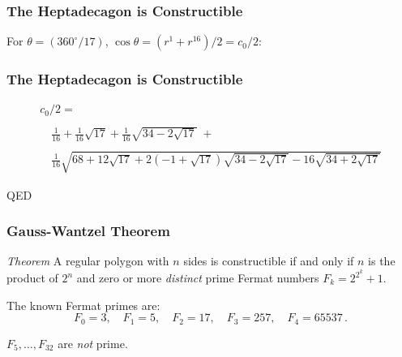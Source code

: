 \documentclass{beamer}
\begin{document}

\begin{frame}
\frametitle{The Heptadecagon is Constructible}
For $\theta=(360^\circ/17)$, $\cos\theta=(r^1+r^{16})/2= c_0/2$:

\bigskip

\begin{center}
\end{center}
\end{frame}


\begin{frame}
\frametitle{The Heptadecagon is Constructible}
\vspace{-4ex}
\[
\begin{array}{l}
c_0/2=\\\\
\quad\displaystyle\frac{1}{16}+\displaystyle\frac{1}{16}\sqrt{17} + 
     \displaystyle\frac{1}{16}\sqrt{34-2\sqrt{17}}\; +\\\\
 \quad\displaystyle\frac{1}{16}\sqrt{
     68+12\sqrt{17} + 
     2(-1+\sqrt{17})\sqrt{34-2\sqrt{17}}
   -16
     \sqrt{34+2\sqrt{17}}
   }
\end{array}
\]
\bigskip

\begin{center}
\Large QED
\end{center}

\end{frame}


\begin{frame}
\frametitle{Gauss-Wantzel Theorem}
\textit{Theorem} A regular polygon with $n$ sides is constructible if and only if $n$ is the product of $2^n$ and zero or more \emph{distinct} prime Fermat numbers $F_k=2^{2^k}+1$.

\bigskip
\bigskip

The known Fermat primes are:
\[
F_0=3,\quad F_1=5,\quad F_2=17,\quad F_3=257,\quad F_4=65537\,.
\]

$F_5,\ldots,F_{32}$ are \textit{not} prime.
\end{frame}
\end{document}
